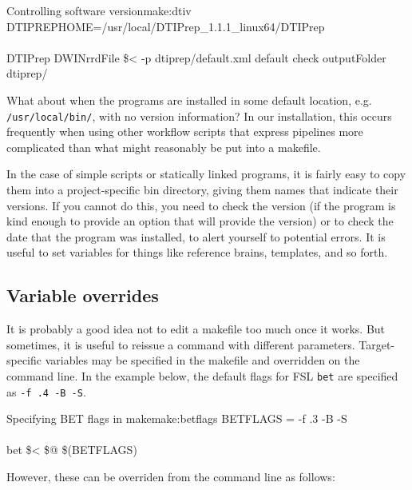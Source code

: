 \begin{make}{Controlling software version}{make:dtiv}
	DTIPREPHOME=/usr/local/DTIPrep_1.1.1_linux64/DTIPrep \\
	
	 \\
	\tab DTIPrep \dd DWINrrdFile \$< -p dtiprep/default.xml \dd default \dd check \dd outputFolder dtiprep/ \\	
\end{make}

What about when the programs are installed in some default location, e.g. \texttt{/usr/local/bin/}, with no version information? In our installation, this occurs frequently when using other workflow scripts that express pipelines more complicated than what might reasonably be put into a makefile.

In the case of simple scripts or statically linked programs, it is fairly easy to copy them into a project-specific bin directory, giving them names that indicate their versions. If you cannot do this, you need to check the version (if the program is kind enough to provide an option that will provide the version) or to check the date that the program was installed, to alert yourself to potential errors. It is useful to set variables for things like reference brains, templates, and so forth. 

\subsection{Variable overrides}
It is probably a good idea not to edit a makefile too much once it works. But sometimes, it is useful to reissue a command with different parameters. Target-specific variables may be specified in the makefile and overridden on the command line. In the example below, the default flags for FSL \texttt{bet} are specified as \texttt{-f .4 -B -S}.

\begin{make}{Specifying BET flags in make}{make:betflags}
	BETFLAGS = -f .3 -B -S\\
	 \\
	\tab bet \$< \$@ \$(BETFLAGS) \\
\end{make}

However, these can be overriden from the command line as follows:



